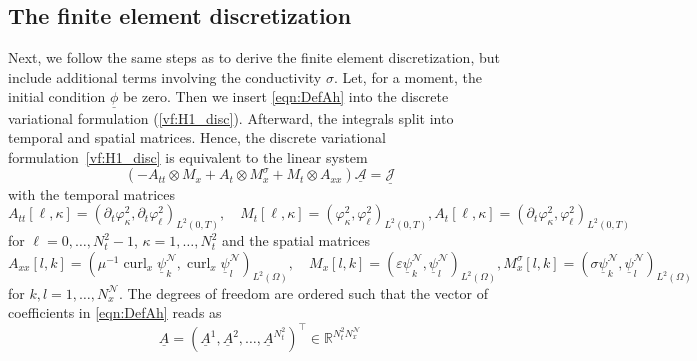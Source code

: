 \documentclass[a4paper,11pt]{article}
\newcommand{\R}{\mathbb R}
\newcommand{\cu}{\operatorname{curl}}
\renewcommand{\vec}[1]{\underline{#1}}
\begin{document}
\subsection{The finite element discretization}
Next, we follow the same steps as \cite{HauserZank2023} to derive the finite element discretization, but include additional terms involving the conductivity $\sigma$.  Let, for a moment, the initial condition $\vec\phi$ be zero. Then we insert \eqref {eqn:DefAh} into the  discrete variational formulation (\ref{vf:H1_disc}). Afterward, the integrals split into temporal and spatial matrices.
Hence, the discrete variational formulation~\eqref{vf:H1_disc} is equivalent to the linear system
\begin{equation} \label{FEM:LGS}
	(-A_{tt} \otimes M_{x} + A_{t} \otimes M_{x}^{\sigma}  + M_{t} \otimes A_{xx}) \vec{ \mathcal A }= \vec{\mathcal J}
\end{equation}
with the temporal matrices
\begin{subequations}  \label{FEM:Ohne:Zeitmatrizen}
	\begin{equation}
		A_{tt}[\ell,\kappa] = (\partial_t \varphi^2_\kappa, \partial_t \varphi^2_\ell)_{L^2(0,T)}, \quad M_{t}[\ell,\kappa] = (\varphi^2_\kappa, \mathcal  \varphi^2_\ell)_{L^2(0,T)},
	\end{equation}
	\begin{equation}
		A_{t}[\ell,\kappa] = (\partial_t \varphi^2_\kappa,  \varphi^2_\ell)_{L^2(0,T)}
	\end{equation}
\end{subequations}
for  $\ell=0,\dots,N_t^2-1$, $\kappa=1,\dots,N_t^2$ and the spatial matrices
\begin{subequations}
	\label{FEM:Ortsmatrizen}
	\begin{equation} \label{FEM:Ortsmatrizen1}
		A_{xx}[l,k] = (\mu^{-1}\cu_x \vec \psi^\mathcal{N}_k, \cu_x \vec \psi^\mathcal{N}_l)_{L^2(\Omega)}, \quad M_{x}[l,k] = (\varepsilon \vec \psi^\mathcal{N}_k, \vec \psi^\mathcal{N}_l)_{L^2(\Omega)},
	\end{equation}
	\begin{equation} \label{FEM:Ortsmatrizen2}
		M_{x}^{\sigma}[l,k] = (\sigma \vec \psi^\mathcal{N}_k, \vec \psi^\mathcal{N}_l)_{L^2(\Omega)}
	\end{equation}
\end{subequations}
for $k,l=1,\dots,N_x^\mathcal{N}.$ The degrees of freedom are ordered such that the vector of coefficients in  \eqref{eqn:DefAh} reads as
\begin{equation} \label{FEM:Ohne:VectorAh}
	\vec{A} = ( \vec{A}^1, \vec{A}^2, \dots, \vec{A}^{N_t^2} )^\top \in \R^{N_t^2 N_x^\mathcal{N}}
\end{equation}
\end{document}

